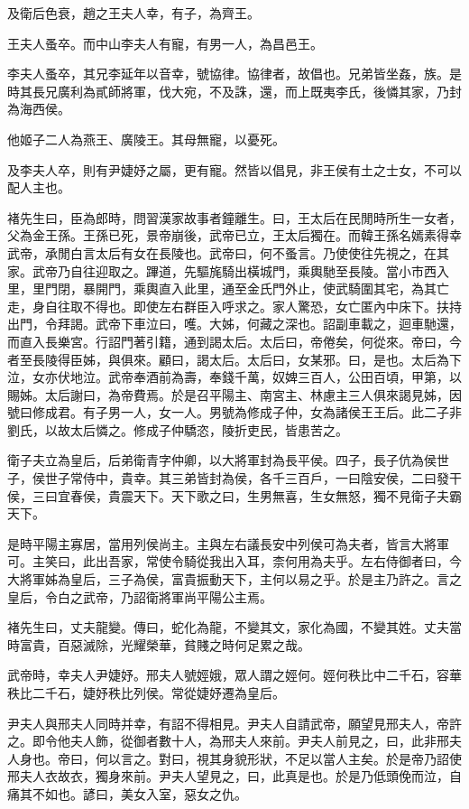 及衛后色衰，趙之王夫人幸，有子，為齊王。

王夫人蚤卒。而中山李夫人有寵，有男一人，為昌邑王。

李夫人蚤卒，其兄李延年以音幸，號協律。協律者，故倡也。兄弟皆坐姦，族。是時其長兄廣利為貳師將軍，伐大宛，不及誅，還，而上既夷李氏，後憐其家，乃封為海西侯。

他姬子二人為燕王、廣陵王。其母無寵，以憂死。

及李夫人卒，則有尹婕妤之屬，更有寵。然皆以倡見，非王侯有土之士女，不可以配人主也。

褚先生曰，臣為郎時，問習漢家故事者鐘離生。曰，王太后在民閒時所生一女者，父為金王孫。王孫已死，景帝崩後，武帝已立，王太后獨在。而韓王孫名嫣素得幸武帝，承閒白言太后有女在長陵也。武帝曰，何不蚤言。乃使使往先視之，在其家。武帝乃自往迎取之。蹕道，先驅旄騎出橫城門，乘輿馳至長陵。當小市西入里，里門閉，暴開門，乘輿直入此里，通至金氏門外止，使武騎圍其宅，為其亡走，身自往取不得也。即使左右群臣入呼求之。家人驚恐，女亡匿內中床下。扶持出門，令拜謁。武帝下車泣曰，嚄。大姊，何藏之深也。詔副車載之，迴車馳還，而直入長樂宮。行詔門著引籍，通到謁太后。太后曰，帝倦矣，何從來。帝曰，今者至長陵得臣姊，與俱來。顧曰，謁太后。太后曰，女某邪。曰，是也。太后為下泣，女亦伏地泣。武帝奉酒前為壽，奉錢千萬，奴婢三百人，公田百頃，甲第，以賜姊。太后謝曰，為帝費焉。於是召平陽主、南宮主、林慮主三人俱來謁見姊，因號曰修成君。有子男一人，女一人。男號為修成子仲，女為諸侯王王后。此二子非劉氏，以故太后憐之。修成子仲驕恣，陵折吏民，皆患苦之。

衛子夫立為皇后，后弟衛青字仲卿，以大將軍封為長平侯。四子，長子伉為侯世子，侯世子常侍中，貴幸。其三弟皆封為侯，各千三百戶，一曰陰安侯，二曰發干侯，三曰宜春侯，貴震天下。天下歌之曰，生男無喜，生女無怒，獨不見衛子夫霸天下。

是時平陽主寡居，當用列侯尚主。主與左右議長安中列侯可為夫者，皆言大將軍可。主笑曰，此出吾家，常使令騎從我出入耳，柰何用為夫乎。左右侍御者曰，今大將軍姊為皇后，三子為侯，富貴振動天下，主何以易之乎。於是主乃許之。言之皇后，令白之武帝，乃詔衛將軍尚平陽公主焉。

褚先生曰，丈夫龍變。傳曰，蛇化為龍，不變其文，家化為國，不變其姓。丈夫當時富貴，百惡滅除，光耀榮華，貧賤之時何足累之哉。

武帝時，幸夫人尹婕妤。邢夫人號娙娥，眾人謂之娙何。娙何秩比中二千石，容華秩比二千石，婕妤秩比列侯。常從婕妤遷為皇后。

尹夫人與邢夫人同時并幸，有詔不得相見。尹夫人自請武帝，願望見邢夫人，帝許之。即令他夫人飾，從御者數十人，為邢夫人來前。尹夫人前見之，曰，此非邢夫人身也。帝曰，何以言之。對曰，視其身貌形狀，不足以當人主矣。於是帝乃詔使邢夫人衣故衣，獨身來前。尹夫人望見之，曰，此真是也。於是乃低頭俛而泣，自痛其不如也。諺曰，美女入室，惡女之仇。

